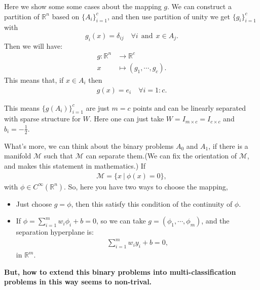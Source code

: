 \begin{remark} Here we show some some cases about the mapping $g$. We can construct a partition of $\mathbb{R}^n$ based on $\{A_i\}_{i=1}^c$, and then use partition of unity we get
$\{g_i\}_{i=1}^c$ with 
\begin{equation}
g_{i}(x) = \delta_{ij} \quad \forall i ~~ \text{and}~~  x \in A_j.
\end{equation}
Then we will have:
\begin{align}
g: \mathbb{R}^n &\to \mathbb{R}^c \\
x &\mapsto (g_1, \cdots, g_c).
\end{align}
This means that, if $x\in A_i$ then
\begin{align}
g(x) = e_i \quad \forall i = 1:c.
\end{align}

This means $\{g(A_i)\}_{i=1}^c$ are just $ m = c$ points and can be linearly separated with sparse structure for $W$. Here one can just take $W = I_{m \times c} = I_{c\times c}$ and $b_i = -\frac{1}{2}$.

What's more, we can think about the binary problems $A_0$ and $A_1$, if there is a manifold $\mathcal{M}$ such that $\mathcal{M}$ can separate them.(We can fix the orientation of $\mathcal{M}$, and makes this statement in mathematics.) If 
\begin{align}
\mathcal{M} = \{ x ~ | ~ \phi(x) = 0\},
\end{align}
with $\phi \in C^{\infty}(\mathbb{R}^n)$. So, here you have two ways to choose the mapping,
\begin{itemize}
\item Just choose $g = \phi$, then this satisfy this condition of the continuity of $\phi$.
\item If $\phi = \sum_{i=1}^m w_i \phi_i + b = 0$, so we can take $g = (\phi_1, \cdots, \phi_m)$, and the separation hyperplane is:
\begin{align}
\sum_{i=1}^m w_i y_i + b = 0,
\end{align}
in $\mathbb{R}^m$.
\end{itemize}

{\bf But, how to extend this binary problems into multi-classification problems in this way seems to 
non-trival.}

\end{remark}


